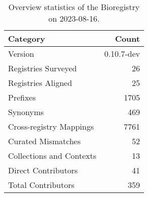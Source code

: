 \begin{table}
\caption{Overview statistics of the Bioregistry on 2023-08-16.}
\label{tab:bioregistry-summary}
\begin{tabular}{lr}
\toprule
Category & Count \\
\midrule
Version & 0.10.7-dev \\
Registries Surveyed & 26 \\
Registries Aligned & 25 \\
Prefixes & 1705 \\
Synonyms & 469 \\
Cross-registry Mappings & 7761 \\
Curated Mismatches & 52 \\
Collections and Contexts & 13 \\
Direct Contributors & 41 \\
Total Contributors & 359 \\
\bottomrule
\end{tabular}
\end{table}
